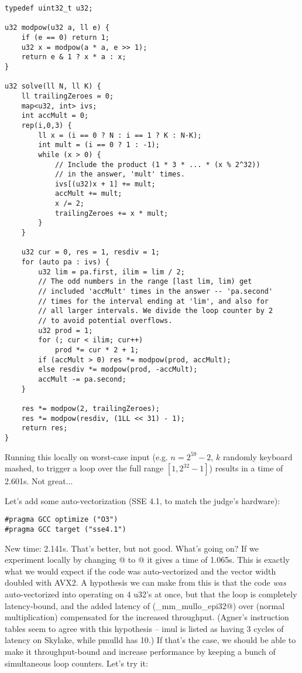 \documentclass[openany]{book}
\begin{document}
\begin{lstlisting}
typedef uint32_t u32;

u32 modpow(u32 a, ll e) {
	if (e == 0) return 1;
	u32 x = modpow(a * a, e >> 1);
	return e & 1 ? x * a : x;
}

u32 solve(ll N, ll K) {
	ll trailingZeroes = 0;
	map<u32, int> ivs;
	int accMult = 0;
	rep(i,0,3) {
		ll x = (i == 0 ? N : i == 1 ? K : N-K);
		int mult = (i == 0 ? 1 : -1);
		while (x > 0) {
			// Include the product (1 * 3 * ... * (x % 2^32))
			// in the answer, 'mult' times.
			ivs[(u32)x + 1] += mult;
			accMult += mult;
			x /= 2;
			trailingZeroes += x * mult;
		}
	}

	u32 cur = 0, res = 1, resdiv = 1;
	for (auto pa : ivs) {
		u32 lim = pa.first, ilim = lim / 2;
		// The odd numbers in the range [last lim, lim) get
		// included 'accMult' times in the answer -- 'pa.second'
		// times for the interval ending at 'lim', and also for
		// all larger intervals. We divide the loop counter by 2
		// to avoid potential overflows.
		u32 prod = 1;
		for (; cur < ilim; cur++)
			prod *= cur * 2 + 1;
		if (accMult > 0) res *= modpow(prod, accMult);
		else resdiv *= modpow(prod, -accMult);
		accMult -= pa.second;
	}

	res *= modpow(2, trailingZeroes);
	res *= modpow(resdiv, (1LL << 31) - 1);
	return res;
}
\end{lstlisting}

Running this locally on worst-case input (e.g. $n = 2^{59}-2$, $k$ randomly keyboard mashed, to trigger a loop over the full range $[1, 2^{32}-1]$) results in a time of 2.601s. Not great...

Let's add some auto-vectorization (SSE 4.1, to match the judge's hardware):
\begin{lstlisting}
#pragma GCC optimize ("O3")
#pragma GCC target ("sse4.1")
\end{lstlisting}

New time: 2.141s. That's better, but not good. What's going on?
If we experiment locally by changing @ to @ it gives a time of 1.065s.
This is exactly what we would expect if the code was auto-vectorized and the vector width doubled with AVX2.
A hypothesis we can make from this is that the code \emph{was} auto-vectorized into operating on 4 u32's at once, but that the loop is completely latency-bound, and the added latency of \verb@pmulld@ (\verb@_mm_mullo_epi32@) over \verb@imul@ (normal multiplication) compensated for the increased throughput.
(Agner's instruction tables seem to agree with this hypothesis -- imul is listed as having 3 cycles of latency on Skylake, while pmulld has 10.)
If that's the case, we should be able to make it throughput-bound and increase performance by keeping a bunch of simultaneous loop counters.
Let's try it:
\end{document}
